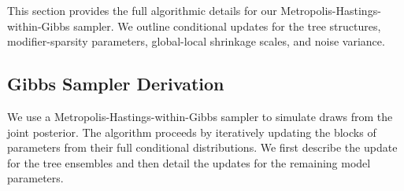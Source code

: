 \documentclass[11pt]{article}
\theoremstyle{plain}
\theoremstyle{definition}
\theoremstyle{plain}
\begin{document}
This section provides the full algorithmic details for our Metropolis-Hastings-within-Gibbs sampler. We outline conditional updates for the tree structures, modifier-sparsity parameters, global-local shrinkage scales, and noise variance.
\subsection*{Gibbs Sampler Derivation}
We use a Metropolis-Hastings-within-Gibbs sampler to simulate draws from the joint posterior. The algorithm proceeds by iteratively updating the blocks of parameters from their full conditional distributions. We first describe the update for the tree ensembles and then detail the updates for the remaining model parameters.
\end{document}
